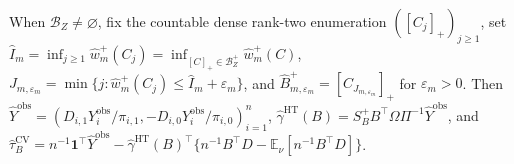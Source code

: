 When \(\mathcal B_Z\ne\varnothing\), fix the countable dense rank-two enumeration \(([C_j]_+)_{j\ge1}\), set \(\widehat I_m=\inf_{j\ge1}\widehat w_m^+(C_j)=\inf_{[C]_+\in\mathcal B_Z^+}\widehat w_m^+(C)\), \(J_{m,\varepsilon_m}=\min\{j:\widehat w_m^+(C_j)\le\widehat I_m+\varepsilon_m\}\), and \(\widehat B_{m,\varepsilon_m}^+=[C_{J_{m,\varepsilon_m}}]_+\) for \(\varepsilon_m>0\).  Then \(\widehat Y^{\mathrm{obs}}=(D_{i,1}Y_i^{\mathrm{obs}}/\pi_{i,1},-D_{i,0}Y_i^{\mathrm{obs}}/\pi_{i,0})_{i=1}^n\), \(\widehat\gamma^{\mathrm{HT}}(B)=S_B^+B^{\top}\Omega\Pi^{-1}\widehat Y^{\mathrm{obs}}\), and \(\widehat\tau_B^{\mathrm{CV}}=n^{-1}\mathbf1^{\top}\widehat Y^{\mathrm{obs}}-\widehat\gamma^{\mathrm{HT}}(B)^{\top}\{n^{-1}B^{\top}D-\mathbb E_\nu[n^{-1}B^{\top}D]\}\).
